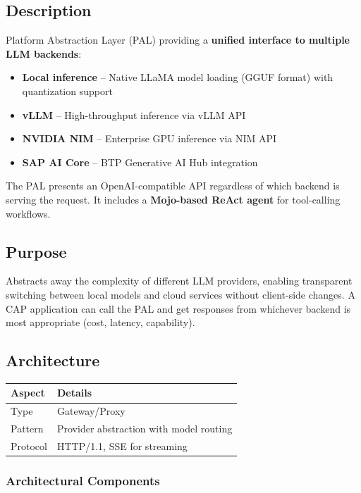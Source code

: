 \documentclass[11pt,a4paper]{article}
\begin{document}
\subsection{Description}

Platform Abstraction Layer (PAL) providing a \textbf{unified interface to multiple LLM backends}:

\begin{itemize}[noitemsep]
    \item \textbf{Local inference} -- Native LLaMA model loading (GGUF format) with quantization support
    \item \textbf{vLLM} -- High-throughput inference via vLLM API
    \item \textbf{NVIDIA NIM} -- Enterprise GPU inference via NIM API
    \item \textbf{SAP AI Core} -- BTP Generative AI Hub integration
\end{itemize}

The PAL presents an OpenAI-compatible API regardless of which backend is serving the request. It includes a \textbf{Mojo-based ReAct agent} for tool-calling workflows.

\subsection{Purpose}

Abstracts away the complexity of different LLM providers, enabling transparent switching between local models and cloud services without client-side changes. A CAP application can call the PAL and get responses from whichever backend is most appropriate (cost, latency, capability).

\subsection{Architecture}

\begin{tabular}{@{}L{4cm}L{10cm}@{}}
\toprule
\textbf{Aspect} & \textbf{Details} \\
\midrule
Type & Gateway/Proxy \\
Pattern & Provider abstraction with model routing \\
Protocol & HTTP/1.1, SSE for streaming \\
\bottomrule
\end{tabular}

\subsubsection{Architectural Components}
\end{document}
